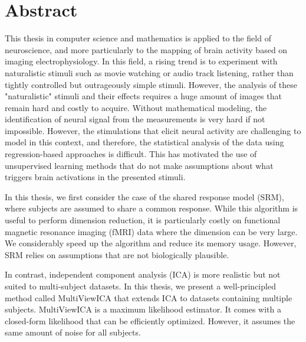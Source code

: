 \begingroup
\let\clearpage\relax
\let\cleardoublepage\relax
\let\cleardoublepage\relax

\chapter*{Abstract}
This thesis in computer science and mathematics is applied to the field of
neuroscience, and more particularly to the mapping of brain activity based on imaging electrophysiology.
%
In this field, a rising trend is to experiment with naturalistic stimuli such as movie watching or audio track listening,
rather than tightly controlled but outrageously simple stimuli.
However, the analysis of these "naturalistic" stimuli and their effects requires a huge amount of images that remain hard and costly to acquire.
%
Without mathematical modeling, the
identification of neural signal from the measurements is very hard if not impossible.
%
However, the stimulations that elicit neural activity are challenging to model in this context, and therefore, the statistical analysis of the data using regression-based approaches is difficult.
%
This has motivated the use of unsupervised learning methods that do not make assumptions about what triggers brain activations in the presented stimuli.

In this thesis, we first consider the case of the shared response model (SRM), where
subjects are assumed to share a common response. While this algorithm is useful
to perform dimension reduction, it is particularly costly on functional magnetic
resonance imaging (fMRI) data where the
dimension can be very large. We considerably speed up the
algorithm and reduce its memory usage. However, SRM relies on assumptions that
are not biologically plausible.

In contrast, independent component analysis (ICA) is more realistic but not suited to multi-subject datasets. In this thesis, we present a well-principled method called MultiViewICA that extends ICA to datasets containing multiple subjects.
MultiViewICA is a maximum likelihood estimator. It comes with a closed-form
likelihood that can be efficiently optimized. However, it assumes the same amount of noise for all subjects.

